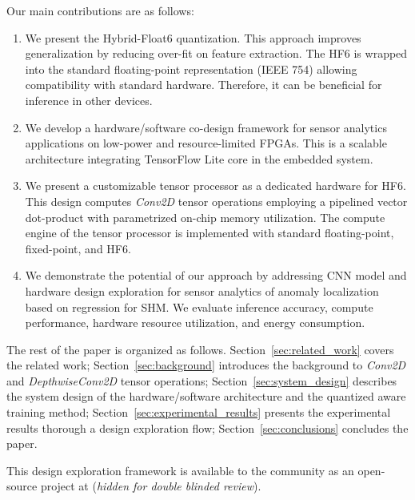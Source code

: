 Our main contributions are as follows:
\begin{enumerate}
	\item We present the Hybrid-Float6 quantization. This approach improves generalization by reducing over-fit on feature extraction. The HF6 is wrapped into the standard floating-point representation (IEEE 754) allowing compatibility with standard hardware. Therefore, it can be beneficial for inference in other devices.
	\item We develop a hardware/software co-design framework for sensor analytics applications on low-power and resource-limited FPGAs. This is a scalable architecture integrating TensorFlow Lite core in the embedded system.
	\item We present a customizable tensor processor as a dedicated hardware for HF6. This design computes \emph{Conv2D} tensor operations employing a pipelined vector dot-product with parametrized on-chip memory utilization. The compute engine of the tensor processor is implemented with standard floating-point, fixed-point, and HF6.
	\item We demonstrate the potential of our approach by addressing CNN model and hardware design exploration for sensor analytics of anomaly localization based on regression for SHM. We evaluate inference accuracy, compute performance, hardware resource utilization, and energy consumption.
\end{enumerate}

The rest of the paper is organized as follows. Section~\ref{sec:related_work} covers the related work; Section~\ref{sec:background} introduces the background to \emph{Conv2D} and \emph{DepthwiseConv2D} tensor operations; Section~\ref{sec:system_design} describes the system design of the hardware/software architecture and the quantized aware training method; Section~\ref{sec:experimental_results} presents the experimental results thorough a design exploration flow; Section~\ref{sec:conclusions} concludes the paper.

This design exploration framework is available to the community as an open-source project at (\emph{hidden for double blinded review}).